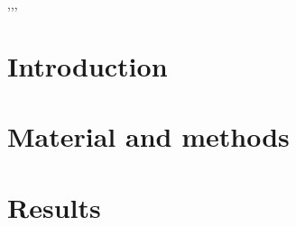 \documentclass[a4paper,fleqn]{cas-sc}
\begin{document}

\begin{abstract}
Here goes the abstract \nocite{*}%
\end{abstract}


\begin{highlights}
\item 
\item 
\item 
\end{highlights}


\begin{keywords}
 \sep \sep \sep
\end{keywords}

\maketitle

\section{Introduction}\label{}
\section{Material and methods}
\section{Results}

\end{document}
